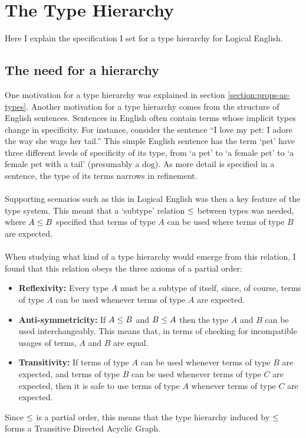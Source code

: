 \documentclass[../main.tex]{subfiles}
\begin{document}

\section{The Type Hierarchy}
\label{section:type-hierarchy}
Here I explain the specification I set for a type hierarchy for Logical English.

\subsection{The need for a hierarchy}
One motivation for a type hierarchy was explained in section \ref{section:props-as-types}. Another motivation for a type hierarchy comes from the structure of English sentences. Sentences in English often contain terms whose implicit types change in specificity. 
For instance, consider the sentence ``I love my pet: I adore the way she wags her tail.'' This simple English sentence has the term `pet' have three different levels of specificity of its type, from `a pet' to `a female pet' to `a female pet with a tail' (presumably a dog). As more detail is specified in a sentence, the type of its terms narrows in refinement. 
\\
\\
Supporting scenarios such as this in Logical English was then a key feature of the type system. This meant that a `subtype' relation $\leq$ between types was needed, where $A \leq B$ specified that terms of type $A$ can be used where terms of type $B$ are expected. 
\\
\\
When studying what kind of a type hierarchy would emerge from this relation, I found that this relation obeys the three axioms of a partial order:
\begin{itemize}
    \item \textbf{Reflexivity:} Every type $A$ must be a subtype of itself, since, of course, terms of type $A$ can be used whenever terms of type $A$ are expected.
    \item \textbf{Anti-symmetricity:} If $A \leq B$ and $B \leq A$ then the type $A$ and $B$ can be used interchangeably. This means that, in terms of checking for incompatible usages of terms, $A$ and $B$ are equal. 
    \item \textbf{Transitivity:} If terms of type $A$ can be used whenever terms of type $B$ are expected, and terms of type $B$ can be used whenever terms of type $C$ are expected, then it is safe to use terms of type $A$ whenever terms of type $C$ are expected.
\end{itemize}
Since $\leq$ is a partial order, this means that the type hierarchy induced by $\leq$ forms a Transitive Directed Acyclic Graph.
\end{document}
